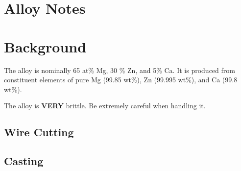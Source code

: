 \section{\MgZnCa Alloy Notes}

\section{Background}
The \MgZnCa alloy is nominally 65 at\% Mg, 30 \% Zn, and 5\% Ca. It is produced from constituent elements of pure Mg (99.85 wt\%), Zn (99.995 wt\%), and Ca (99.8 wt\%). 

The \MgZnCa alloy is \textbf{VERY} brittle. Be extremely careful when handling it. 

\subsection{Wire Cutting}


\subsection{Casting}

